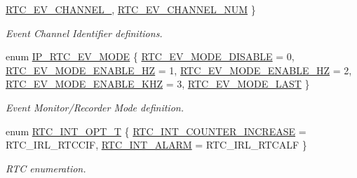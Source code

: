 \begin{DoxyCompactItemize}
\hyperlink{group___r_t_c__18_x_x__43_x_x_ggaac7e8d7c66860037449fdde1bdfb657bab5908409b28ddbf4fd51eaf4f85aeb69}{R\+T\+C\+\_\+\+E\+V\+\_\+\+C\+H\+A\+N\+N\+E\+L\+\_}, 
\hyperlink{group___r_t_c__18_x_x__43_x_x_ggaac7e8d7c66860037449fdde1bdfb657bae56aa8110b05663f96d666d4ce378c85}{R\+T\+C\+\_\+\+E\+V\+\_\+\+C\+H\+A\+N\+N\+E\+L\+\_\+\+N\+UM}
 \}\begin{DoxyCompactList}\small\item\em Event Channel Identifier definitions. \end{DoxyCompactList}
\item 
enum \hyperlink{group___r_t_c__18_x_x__43_x_x_gaefde431348a2ce3d7721a63780e9d9ba}{I\+P\+\_\+\+R\+T\+C\+\_\+\+E\+V\+\_\+\+M\+O\+DE} \{ \newline
\hyperlink{group___r_t_c__18_x_x__43_x_x_ggaefde431348a2ce3d7721a63780e9d9baad24f32a223a364f8c097c31ed1ab3138}{R\+T\+C\+\_\+\+E\+V\+\_\+\+M\+O\+D\+E\+\_\+\+D\+I\+S\+A\+B\+LE} = 0, 
\hyperlink{group___r_t_c__18_x_x__43_x_x_ggaefde431348a2ce3d7721a63780e9d9baa3e6fef6c94b90897af317e8ddb84576d}{R\+T\+C\+\_\+\+E\+V\+\_\+\+M\+O\+D\+E\+\_\+\+E\+N\+A\+B\+L\+E\+\_\+HZ} = 1, 
\hyperlink{group___r_t_c__18_x_x__43_x_x_ggaefde431348a2ce3d7721a63780e9d9baac104b566ab32b4d49c505b7f9528cfbb}{R\+T\+C\+\_\+\+E\+V\+\_\+\+M\+O\+D\+E\+\_\+\+E\+N\+A\+B\+L\+E\+\_\+HZ} = 2, 
\hyperlink{group___r_t_c__18_x_x__43_x_x_ggaefde431348a2ce3d7721a63780e9d9baa5a47148b47f17f5c12b30c89f40d573e}{R\+T\+C\+\_\+\+E\+V\+\_\+\+M\+O\+D\+E\+\_\+\+E\+N\+A\+B\+L\+E\+\_\+K\+HZ} = 3, 
\newline
\hyperlink{group___r_t_c__18_x_x__43_x_x_ggaefde431348a2ce3d7721a63780e9d9baab4e33e3423660ab9e4fa677f4cd438a9}{R\+T\+C\+\_\+\+E\+V\+\_\+\+M\+O\+D\+E\+\_\+\+L\+A\+ST}
 \}\begin{DoxyCompactList}\small\item\em Event Monitor/\+Recorder Mode definition. \end{DoxyCompactList}
\item 
enum \hyperlink{group___r_t_c__18_x_x__43_x_x_gacbb4f3e21ac0f90878c95afe11f49161}{R\+T\+C\+\_\+\+I\+N\+T\+\_\+\+O\+P\+T\+\_\+T} \{ \hyperlink{group___r_t_c__18_x_x__43_x_x_ggacbb4f3e21ac0f90878c95afe11f49161a1545f38fd2671cb7521a77e7da3bde4d}{R\+T\+C\+\_\+\+I\+N\+T\+\_\+\+C\+O\+U\+N\+T\+E\+R\+\_\+\+I\+N\+C\+R\+E\+A\+SE} = R\+T\+C\+\_\+\+I\+R\+L\+\_\+\+R\+T\+C\+C\+IF, 
\hyperlink{group___r_t_c__18_x_x__43_x_x_ggacbb4f3e21ac0f90878c95afe11f49161adec1af649886bf5a419d636276ca54a5}{R\+T\+C\+\_\+\+I\+N\+T\+\_\+\+A\+L\+A\+RM} = R\+T\+C\+\_\+\+I\+R\+L\+\_\+\+R\+T\+C\+A\+LF
 \}\begin{DoxyCompactList}\small\item\em R\+TC enumeration. \end{DoxyCompactList}
\end{DoxyCompactItemize}
